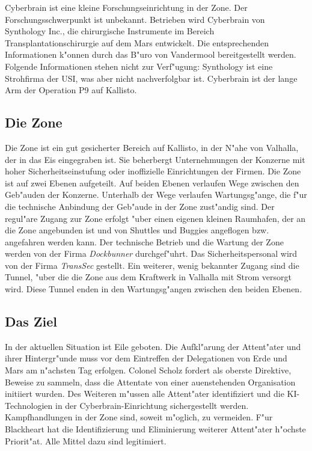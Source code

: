 
Cyberbrain ist eine kleine Forschungseinrichtung in der Zone. Der Forschungsschwerpunkt ist unbekannt. Betrieben wird Cyberbrain von Synthology Inc., die chirurgische Instrumente im Bereich Transplantationschirurgie auf dem Mars entwickelt. Die entsprechenden Informationen k"onnen durch das B"uro von Vandermool bereitgestellt werden. Folgende Informationen stehen nicht zur Verf"ugung: Synthology ist eine Strohfirma der USI, was aber nicht nachverfolgbar ist. Cyberbrain ist der lange Arm der Operation P9 auf Kallisto.

\subsection{Die Zone}
Die Zone ist ein gut gesicherter Bereich auf Kallisto, in der N"ahe von Valhalla, der in das Eis eingegraben ist. Sie beherbergt Unternehmungen der Konzerne mit hoher Sicherheitseinstufung oder inoffizielle Einrichtungen der Firmen. Die Zone ist auf zwei Ebenen aufgeteilt. Auf beiden Ebenen verlaufen Wege zwischen den Geb"auden der Konzerne. Unterhalb der Wege verlaufen Wartungsg"ange, die f"ur die technische Anbindung der Geb"aude in der Zone zust"andig sind. Der regul"are Zugang zur Zone erfolgt "uber einen eigenen kleinen Raumhafen, der an die Zone angebunden ist und von Shuttles und Buggies angeflogen bzw. angefahren werden kann. Der technische Betrieb und die Wartung der Zone werden von der Firma \emph{Dockbunner} durchgef"uhrt. Das Sicherheitspersonal wird von der Firma \emph{TransSec} gestellt. Ein weiterer, wenig bekannter Zugang sind die Tunnel, "uber die die Zone aus dem Kraftwerk in Valhalla mit Strom versorgt wird. Diese Tunnel enden in den Wartungsg"angen zwischen den beiden Ebenen.

\subsection{Das Ziel} 
In der aktuellen Situation ist Eile geboten. Die Aufkl"arung der Attent"ater und ihrer Hintergr"unde muss vor dem Eintreffen der Delegationen von Erde und Mars am n"achsten Tag erfolgen. Colonel Scholz fordert als oberste Direktive, Beweise zu sammeln, dass die Attentate von einer au\3enstehenden Organisation initiiert wurden. Des Weiteren m"ussen alle Attent"ater identifiziert und die KI-Technologien in der Cyberbrain-Einrichtung sichergestellt werden. Kampfhandlungen in der Zone sind, soweit m"oglich, zu vermeiden. F"ur Blackheart hat die Identifizierung und Eliminierung weiterer Attent"ater h"ochste Priorit"at. Alle Mittel dazu sind legitimiert.

